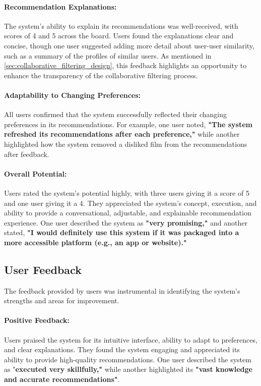 \paragraph{Recommendation Explanations:}  
The system's ability to explain its recommendations was well-received, with scores of 4 and 5 across the board. Users found the explanations clear and concise, though one user suggested adding more detail about user-user similarity, such as a summary of the profiles of similar users. As mentioned in \cref{sec:collaborative_filtering_design}, this feedback highlights an opportunity to enhance the transparency of the collaborative filtering process.

\paragraph{Adaptability to Changing Preferences:}
All users confirmed that the system successfully reflected their changing preferences in its recommendations. For example, one user noted, \textbf{"The system refreshed its recommendations after each preference,"} while another highlighted how the system removed a disliked film from the recommendations after feedback.

\paragraph{Overall Potential:}  
Users rated the system's potential highly, with three users giving it a score of 5 and one user giving it a 4. They appreciated the system's concept, execution, and ability to provide a conversational, adjustable, and explainable recommendation experience. One user described the system as \textbf{"very promising,"} and another stated, \textbf{"I would definitely use this system if it was packaged into a more accessible platform (e.g., an app or website)."}

\subsection{User Feedback}
\label{sec:user_feedback}
The feedback provided by users was instrumental in identifying the system's strengths and areas for improvement.

\paragraph{Positive Feedback:}  
Users praised the system for its intuitive interface, ability to adapt to preferences, and clear explanations. They found the system engaging and appreciated its ability to provide high-quality recommendations. One user described the system as "\textbf{executed very skillfully,"} while another highlighted its \textbf{"vast knowledge and accurate recommendations"}.


